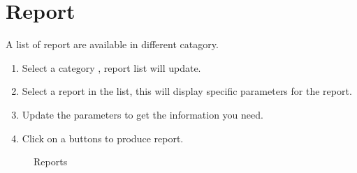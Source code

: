 \documentclass[letterpaper,10pt,english]{sphinxmanual}
\begin{document}
\section{Report}
\label{Report:report}\label{Report:index-0}\label{Report::doc}
A list of report are available in different catagory.
\begin{enumerate}
\item {} 
Select a category , report list  will update.

\item {} 
Select a report in the list, this will display specific parameters  for the report.

\item {} 
Update the parameters to get the information you need.

\item {} 
Click on a buttons to produce report. 

\end{enumerate}
\begin{figure}[htbp]
\centering
\capstart

\caption{Reports}\end{figure}
\end{document}
